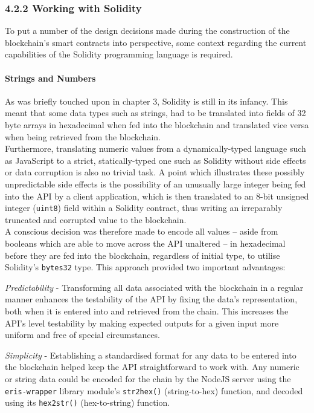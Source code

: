 \documentclass[12pt]{report}
\let\oldparagraph\paragraph
\renewcommand{\paragraph}[1]{\oldparagraph{#1}\mbox{}}
\begin{document}
\subsubsection{4.2.2 Working with Solidity}\label{working-with-solidity}

To put a number of the design decisions made during the construction of
the blockchain's smart contracts into perspective, some context
regarding the current capabilities of the Solidity programming language
is required.

\paragraph{Strings and Numbers}\label{strings-and-numbers}

As was briefly touched upon in chapter 3, Solidity is still in its
infancy. This meant that some data types such as strings, had to be
translated into fields of 32 byte arrays in hexadecimal when fed into
the blockchain and translated vice versa when being retrieved from the
blockchain.\\
Furthermore, translating numeric values from a dynamically-typed
language such as JavaScript to a strict, statically-typed one such as
Solidity without side effects or data corruption is also no trivial
task. A point which illustrates these possibly unpredictable side
effects is the possibility of an unusually large integer being fed into
the API by a client application, which is then translated to an 8-bit
unsigned integer (\texttt{uint8}) field within a Solidity contract, thus
writing an irreparably truncated and corrupted value to the
blockchain.\\
A conscious decision was therefore made to encode all values -- aside
from booleans which are able to move across the API unaltered -- in
hexadecimal before they are fed into the blockchain, regardless of
initial type, to utilise Solidity's \texttt{bytes32} type. This approach
provided two important advantages:

\emph{Predictability} - Transforming all data associated with the
blockchain in a regular manner enhances the testability of the API by
fixing the data's representation, both when it is entered into and
retrieved from the chain. This increases the API's level testability by
making expected outputs for a given input more uniform and free of
special circumstances.

\emph{Simplicity} - Establishing a standardised format for any data to
be entered into the blockchain helped keep the API straightforward to
work with. Any numeric or string data could be encoded for the chain by
the NodeJS server using the \texttt{eris-wrapper} library module's
\texttt{str2hex()} (string-to-hex) function, and decoded using its
\texttt{hex2str()} (hex-to-string) function.
\end{document}
